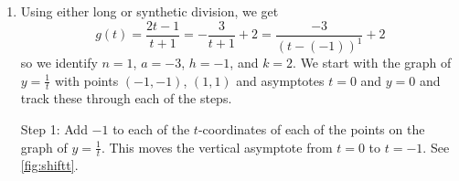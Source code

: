 \begin{ex}
\begin{enumerate}
\begin{figure}
\begin{center}
\[\begin{array}{ccc}
&

\stackrel{\text{\parbox{.5in}{\scriptsize multiply each $y$-coordinate by $\frac{1}{4}$ }}}{ \xrightarrow{\hspace{.5in}}}

&

\begin{mfpic}[10]{-3.5}{6.5}{-1}{9}
\axes
\dashed \polyline{(1.5, -1), (1.5,9)}
\scriptsize
\tlabel[cc](6.5, -0.5){$x$}
\tlabel[cc](0.5, 9){$y$}
\gclear \tlabelrect[cc](-0.5, 0.5){$\left(\frac{1}{2} ,\frac{1}{4} \right)$}
\tlabel[cc](3.5, 0.5){$\left(\frac{5}{2} ,\frac{1}{4} \right)$}
\gclear \tlabelrect[cc](1.5, -0.5){$x = \frac{3}{2}$}
\normalsize
\penwd{1.25pt}
\arrow \reverse \arrow \function{-3.5,1.3333,0.1}{0.25/((x-1.5)**2)}
\arrow \reverse \arrow \function{1.6667,6.5,0.1}{0.25/((x-1.5)**2)}
\point[4pt]{(0.5,0.25), (2.5,0.25)}
\tcaption{\scriptsize $y = \frac{1}{4} \left(x - \frac{3}{2} \right)^{-2}$}
\end{mfpic} \\


\text{\scriptsize  $\left(\frac{1}{2} ,1 \right)$,  $\left(\frac{5}{2} ,1 \right)$} & &\text{\scriptsize  $\left(\frac{1}{2} ,\frac{1}{4} \right)$,  $\left(\frac{5}{2} , \frac{1}{4} \right)$}  \\ \end{array} \]

\caption{}
\label{fig:scaley}
\end{center}
\end{figure}

Since we did not shift the graph vertically, the horizontal asymptote remains $y = 0$.  We can determine the domain and range of $f$ by tracking the changes to the domain and range of our progenitor function, $y = x^{-2}$.  We get the domain and range of $f$ is  $\left(-\infty, \frac{3}{2} \right) \cup \left(\frac{3}{2}, \infty \right)$ and the range of $f$ is $(-\infty, 0) \cup (0, \infty)$. 

\item  Using either long or synthetic division, we get \[g(t) = \frac{2t-1}{t+1} = - \frac{3}{t+1} + 2 = \frac{-3}{(t-(-1))^{1}} + 2\] so we identify $n = 1$, $a = -3$, $h = -1$, and $k = 2$.  We start with the graph of $y = \frac{1}{t}$ with points $(-1,-1)$, $(1,1)$ and asymptotes $t = 0$ and $y =0$ and track these through each of the steps.

Step 1:  Add $-1$ to each of the $t$-coordinates of each of the points on the graph of $y = \frac{1}{t}$. This moves the vertical asymptote from $t=0$ to $t = -1$. See \autoref{fig:shiftt}.


\end{enumerate}
\end{ex}
